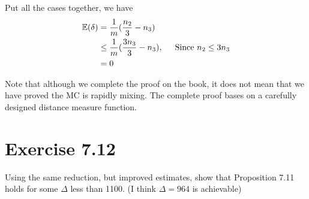 \documentclass{article}
\begin{document}
Put all the cases together, we have
\begin{align*}
  \mathbb{E}(\delta) &= \frac{1}{m}(\frac{n_2}{3} - n_3) \\
  &\leq \frac{1}{m}(\frac{3n_3}{3} - n_3), \hspace{0.5cm} \mbox{Since $n_2\leq 3n_3$} \\
  &= 0
\end{align*}

\begin{tcolorbox}[title={Note}]
Note that although we complete the proof on the book, it does not mean that we have proved the MC is rapidly mixing. The complete proof bases on a carefully designed distance measure function.
\end{tcolorbox}

\section{Exercise 7.12}
Using the same reduction, but improved estimates, show that Proposition 7.11 holds for some $\Delta$ less than 1100. (I think $\Delta = 964$ is achievable)
\end{document}
